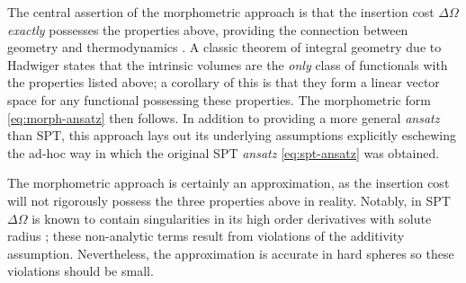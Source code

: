 The central assertion of the morphometric approach is that the insertion cost $\Delta \Omega$ \emph{exactly} possesses the properties above, providing the connection between geometry and thermodynamics \cite{KonigPRL2004}.
A classic theorem of integral geometry due to Hadwiger \cite{Hadwiger1957} states that the intrinsic volumes are the \emph{only} class of functionals with the properties listed above; a corollary of this is that they form a linear vector space for any functional possessing these properties.
The morphometric form \eqref{eq:morph-ansatz} then follows.
In addition to providing a more general \emph{ansatz} than SPT, this approach lays out its underlying assumptions explicitly eschewing the ad-hoc way in which the original SPT \emph{ansatz} \eqref{eq:spt-ansatz} was obtained.

The morphometric approach is certainly an approximation, as the insertion cost will not rigorously possess the three properties above in reality.
Notably, in SPT $\Delta\Omega$ is known to contain singularities in its high order derivatives with solute radius \cite{ReissJCP1959}; these non-analytic terms result from violations of the additivity assumption.
Nevertheless, the approximation is accurate in hard spheres \cite{OettelEL2009,AshtonPRE2011,LairdPRE2012,BlokhuisPRE2013,UrrutiaPRE2014,Hansen-GoosJCP2014} so these violations should be small.

